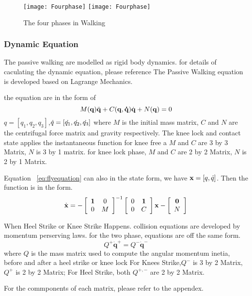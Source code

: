 \begin{figure}[!htbp]
  \begin{center}
    \leavevmode
    \ifpdf
      \texttt{[image: Fourphase]}
    \else
      \texttt{[image: Fourphase]}
    \fi
    \caption{The four phases in Walking}
    \label{fig:fwalkingphase}
\end{center}
\end{figure}

\subsubsection*{Dynamic Equation}

The passive walking are modelled as rigid body dynamics.
for details of caculating the dynamic equation, please reference\citep{Chen2007}
The Passive Walking equation is developed based on Lagrange Mechanics.


\begin{itemize}
the equation are in the form of 
\begin{equation}
\label{eq:flyequation}
M(\mathbf{q}) \ddot{\mathbf{q}} + C(\mathbf{q,\dot{q}})\dot{\mathbf{q}} + N(\mathbf{q}) = 0
\end{equation}
$q=[q_1,q_2,q_3]$,$\dot{q}=[\dot{q_1},\dot{q_2},\dot{q_3}]$
where $M$ is the initial mass matrix, $C$ and $N$ are the centrifugal force matrix and gravity respectively. The knee lock and contact state applies the instantaneous function
for knee free a  $M$ and $C$ are 3 by 3 Matrix, $N$ is 3 by 1 matrix.
for knee lock phase, $M$ and $C$ are 2 by 2 Matrix, $N$ is 2 by 1 Matrix.


Equation ~\ref{eq:flyequation} can also in the state form, we have $\mathbf{x}=[q,\dot{q}]$.
Then the function is in the form.
\begin{equation}
\dot{\mathbf{x}}=
-\left[ 
\begin{array}{cc}
\mathbf{1} &0\\
0 &M 
\end{array}
\right]^{-1}
\left[ 
\begin{array}{cc}
0 &\mathbf{1}\\
0 &C 
\end{array}
\right]\mathbf{x}
-\left[ 
\begin{array}{c}
\mathbf{0}\\
 N 
\end{array}
\right]
\end{equation}

When Heel Strike or Knee Strike Happens.
collision equations are developed by momentum perserving laws.
for the two phase, equations are off the same form.
\begin{equation}
Q^{+}\dot{\mathbf{q}}^{+} = Q^{-}\dot{\mathbf{q}}^{-}
\end{equation}
where $Q$ is the mass matrix used to compute the angular momentum inetia, before and after a heel strike or knee lock
For Knees Strike,$Q^-$ is 3 by 2 Matrix, $Q^+$ is 2 by 2 Matrix;
For Heel Strike, both $Q^{+,-}$ are 2 by 2 Matrix.
\end{itemize}
For the commponents of each matrix, please refer to the appendex.




